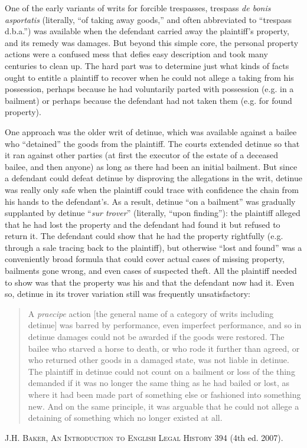 One of the early variants of writs for forcible trespasses, trespass \textit{de
bonis asportatis} (literally, ``of taking away goods,'' and often abbreviated
to ``trespass d.b.a.'') was available when the defendant carried away the
plaintiff's property, and its remedy was damages. But beyond this simple core,
the personal property actions were a confused mess that defies easy description
and took many centuries to clean up. The hard part was to determine just what
kinds of facts ought to entitle a plaintiff to recover when he could not allege
a taking from his possession, perhaps because he had voluntarily parted with
possession (e.g. in a bailment) or perhaps because the defendant had not taken
them (e.g. for found property). 

One approach was the older writ of detinue, which was available against a bailee
who ``detained'' the goods from the plaintiff. The courts extended detinue so
that it ran against other parties (at first the executor of the estate of a
deceased bailee, and then anyone) as long as there had been an initial
bailment. But since a defendant could defeat detinue by disproving the
allegations in the writ, detinue was really only safe when the plaintiff could
trace with confidence the chain from his hands to the defendant's. As a result,
detinue ``on a bailment'' was gradually supplanted by detinue ``\textit{sur
trover}'' (literally, ``upon finding''): the plaintiff alleged that he had
lost the property and the defendant had found it but refused to return it. The
defendant could show that he had the property rightfully (e.g. through a sale
tracing back to the plaintiff), but otherwise ``lost and found'' was a
conveniently broad formula that could cover actual cases of missing property,
bailments gone wrong, and even cases of suspected theft. All the plaintiff
needed to show was that the property was his and that the defendant now had it.
Even so, detinue in its trover variation still was frequently unsatisfactory:
\begin{quote}
A \textit{praecipe} action [the general name of a category of writs including
detinue] was barred by performance, even imperfect performance, and so in
detinue damages could not be awarded if the goods were restored. The bailee who
starved a horse to death, or who rode it further than agreed, or who returned
other goods in a damaged state, was not liable in detinue. The plaintiff in
detinue could not count on a bailment or loss of the thing demanded if it was
no longer the same thing as he had bailed or lost, as where it had been made
part of something else or fashioned into something new. And on the same
principle, it was arguable that he could not allege a detaining of something
which no longer existed at all.
\end{quote}
\textsc{J.H. Baker, An Introduction to English Legal History} 394 (4th ed.
2007). 

